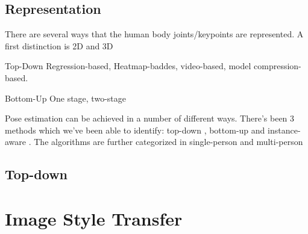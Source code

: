 \subsection{Representation}

There are several ways that the human body joints/keypoints are represented.
A first distinction is 2D and 3D

Top-Down
Regression-based, Heatmap-baddes, video-based, model compression-based.

Bottom-Up
One stage, two-stage

Pose estimation can be achieved in a number of different ways.
There's been 3 methods which we've been able to identify: top-down \cite{alphapose}, bottom-up \cite{blazepose}\cite{openpose} and instance-aware \cite{fcpose}.
The algorithms are further categorized in single-person \cite{blazepose} and multi-person \cite{alphapose}\cite{openpose}\cite{fcpose}

\subsection{Top-down}

\section{Image Style Transfer}
\label{sec:ist}
